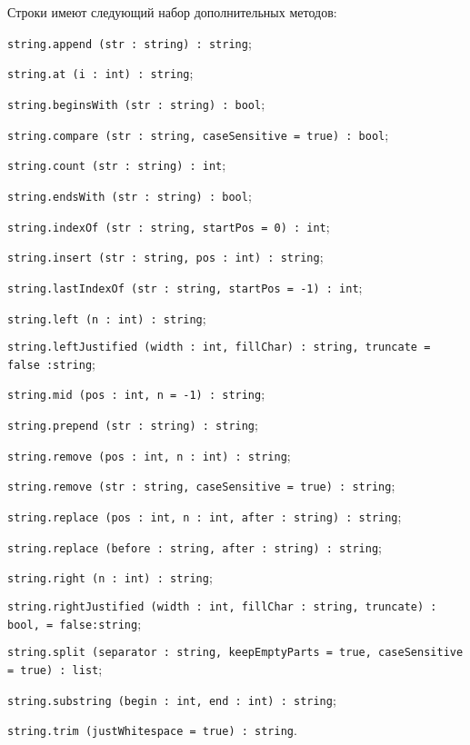 Строки имеют следующий набор дополнительных методов:
\begin{icItems}
\item
    \lstinline|string.append (str : string) : string|;
\item
    \lstinline|string.at (i : int) : string|;
\item
    \lstinline|string.beginsWith (str : string) : bool|;
\item
    \lstinline|string.compare (str : string, caseSensitive = true) : bool|;
\item
    \lstinline|string.count (str : string) : int|;
\item
    \lstinline|string.endsWith (str : string) : bool|;
\item
    \lstinline|string.indexOf (str : string, startPos = 0) : int|;
\item
    \lstinline|string.insert (str : string, pos : int) : string|;
\item
    \lstinline|string.lastIndexOf (str : string, startPos = -1) : int|;
\item
    \lstinline|string.left (n : int) : string|;
\item
    \lstinline|string.leftJustified (width : int, fillChar) : string, truncate = false :string|;
\item
    \lstinline|string.mid (pos : int, n = -1) : string|;
\item
    \lstinline|string.prepend (str : string) : string|;
\item
    \lstinline|string.remove (pos : int, n : int) : string|;
\item
    \lstinline|string.remove (str : string, caseSensitive = true) : string|;
\item
    \lstinline|string.replace (pos : int, n : int, after : string) : string|;
\item
    \lstinline|string.replace (before : string, after : string) : string|;
\item
    \lstinline|string.right (n : int) : string|;
\item
    \lstinline|string.rightJustified (width : int, fillChar : string, truncate) : bool, = false:string|;
\item
    \lstinline|string.split (separator : string, keepEmptyParts = true, caseSensitive = true) : list|;
\item
    \lstinline|string.substring (begin : int, end : int) : string|;
\item
    \lstinline|string.trim (justWhitespace = true) : string|.
\end{icItems}

